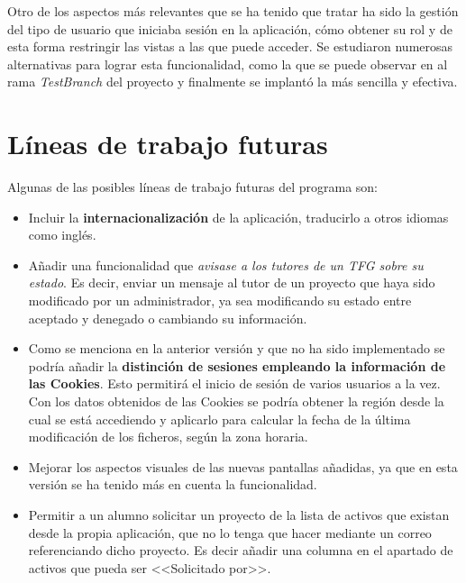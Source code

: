 Otro de los aspectos más relevantes que se ha tenido que tratar ha sido la gestión del tipo de usuario que iniciaba sesión en la aplicación, cómo obtener su rol y de esta forma restringir las vistas a las que puede acceder. Se estudiaron numerosas alternativas para lograr esta funcionalidad, como la que se puede observar en al rama \emph{TestBranch} del proyecto y finalmente se implantó la más sencilla y efectiva.

\section{Líneas de trabajo futuras}

Algunas de las posibles líneas de trabajo futuras del programa son:

\begin{itemize}
	\item Incluir la \textbf{internacionalización} de la aplicación, traducirlo a otros idiomas como inglés.
	\item Añadir una funcionalidad que \emph{avisase a los tutores de un TFG sobre su estado}. Es decir, enviar un mensaje al tutor de un proyecto que haya sido modificado por un administrador, ya sea modificando su estado entre aceptado y denegado o cambiando su información.
	\item Como se menciona en la anterior versión y que no ha sido implementado se podría añadir la \textbf{distinción de sesiones empleando la información de
	las Cookies}. Esto permitirá el inicio de sesión de varios usuarios a la
	vez. Con los datos obtenidos de las Cookies se podría obtener la región
	desde la cual se está accediendo y aplicarlo para calcular la fecha de
	la última modificación de los ficheros, según la zona horaria.
	\item Mejorar los aspectos visuales de las nuevas pantallas añadidas, ya que en esta versión se ha tenido más en cuenta la funcionalidad.
	\item Permitir a un alumno solicitar un proyecto de la lista de activos que existan desde la propia aplicación, que no lo tenga que hacer mediante un correo referenciando dicho proyecto. Es decir añadir una columna en el apartado de activos que pueda ser <<Solicitado por>>.
	
\end{itemize}